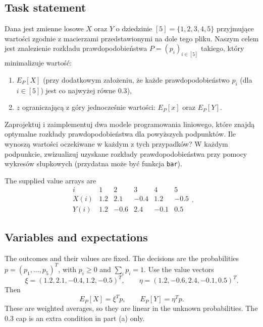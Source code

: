 \documentclass[11pt,a4paper]{article}
\begin{document}
\subsection{Task statement}
\begin{otherlanguage}{polish}
  Dana jest zmienne losowe $X$ oraz $Y$ o dziedzinie
  $[5]=\{1,2,3,4,5\}$ przyjmujące wartości zgodnie z macierzami
  przedstawionymi na dole tego pliku.
  Naszym celem jest znalezienie rozkładu prawdopodobieństwa
  $P=(p_i)_{i\in[5]}$ takiego, który minimalizuje wartość:
  \begin{enumerate}[label=\alph*)]
    \item $E_P[X]$ (przy dodatkowym założeniu, że każde prawdopodobieństwo
          $p_i$ (dla $i\in[5]$) jest co najwyżej równe $0.3$),
    \item $z$ ograniczającą z góry jednocześnie wartości: $E_P[x]$ oraz $E_P[Y]$.
  \end{enumerate}
  Zaprojektuj i zaimplementuj dwa modele programowania liniowego, które znajdą
  optymalne rozkłady prawdopodobieństwa dla powyższych podpunktów. Ile wynoszą
  wartości oczekiwane w każdym z tych przypadków? W każdym podpunkcie,
  zwizualizuj uzyskane rozkłady prawdopodobieństwa przy pomocy wykresów słupkowych
  (przydatna może być funkcja \texttt{bar}).
\end{otherlanguage}
The supplied value arrays are
\[
  \begin{array}{c|rrrrr}
    i&1&2&3&4&5\\\hline
    X(i)&1.2&2.1&-0.4&1.2&-0.5\\
    Y(i)&1.2&-0.6&2.4&-0.1&0.5
  \end{array}.
\]

\subsection{Variables and expectations}
The outcomes and their values are fixed. The decisions are the probabilities
$p=(p_1,\ldots,p_5)^T$, with $p_i\geq0$ and $\sum_i p_i=1$.
Use the value vectors
\[
  \xi=(1.2,2.1,-0.4,1.2,-0.5)^T,\qquad
  \eta=(1.2,-0.6,2.4,-0.1,0.5)^T.
\]
Then
\[
  E_P[X]=\xi^Tp,\qquad E_P[Y]=\eta^Tp.
\]
These are weighted averages, so they are linear in the unknown probabilities.
The $0.3$ cap is an extra condition in part (a) only.
\end{document}
